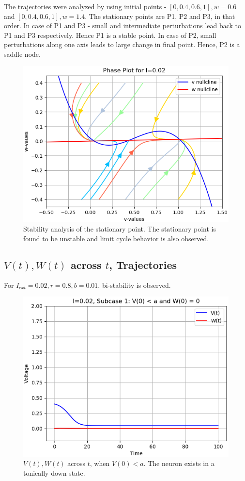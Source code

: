 \documentclass[12pt,a4paper]{article}
\begin{document}
	The trajectories were analyzed by using initial points - $[0, 0.4, 0.6, 1], w=0.6$ and $[0, 0.4, 0.6, 1], w=1.4$. The stationary points are P1, P2 and P3, in that order. In case of P1 and P3 - small and intermediate perturbations lead back to P1 and P3 respectively. Hence P1 is a stable point. In case of P2, small perturbations along one axis leads to large change in final point. Hence, P2 is a saddle node. 

	\begin{figure}[H]
	\centering
	\includegraphics[scale=0.6]{images/Figure_14.png}
	\caption{Stability analysis of the stationary point. The stationary point is found to be unstable and limit cycle behavior is also observed.}
	\end{figure}

\subsection{$V(t), W(t)$ across $t$, Trajectories}
	For $I_{ext}=0.02, r=0.8, b=0.01$, bi-stability is observed.
	\begin{figure}[H]
	\centering
	\includegraphics[scale=0.6]{images/Figure_15.png}
	\caption{$V(t), W(t)$ across $t$, when $V(0)<a$. The neuron exists in a tonically down state.}
	\end{figure}
\end{document}
